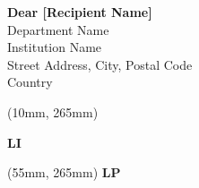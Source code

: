 \documentclass[a4paper,11pt]{letter}
\begin{document}
\begin{letter}{
			\textbf{Dear [Recipient Name]} \\
			Department Name \\
			Institution Name \\
			Street Address, City, Postal Code \\
			Country
		}
		\begin{textblock*}{50mm}(10mm, 265mm) %
			\raggedright
			\Huge \textbf{LI} %
		\end{textblock*}
		
		\begin{textblock*}{50mm}(55mm, 265mm) %
			\raggedleft
			\Huge \textbf{LP} %
		\end{textblock*}
		
	\end{letter}
\end{document}

